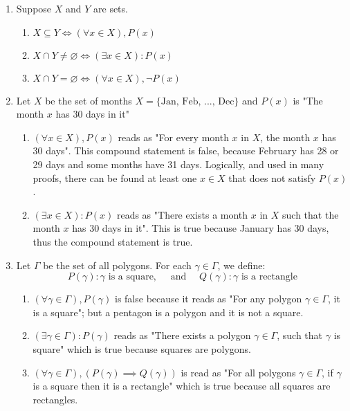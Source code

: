 \begin{example}

    \begin{enumerate}
        \item Suppose $X$ and $Y$ are sets.
            \begin{enumerate}[label=(\alph*)]
                \item $X \subseteq Y \iff (\forall x \in X), P(x)$
                \item $X \cap Y \neq \varnothing \iff (\exists x \in X): P(x)$
                \item $X \cap Y = \varnothing  \iff (\forall x \in X), \neg P(x)$
            \end{enumerate}

        \item Let $X$ be the set of months $X = \{\text{Jan, Feb, ..., Dec}\}$ and $P(x)$ is "The month $x$ has 30 days in it"
            \begin{enumerate}[label=(\alph*)]
                \item $(\forall x \in X), P(x)$ reads as "For every month $x$ in $X$, the month $x$ has 30 days". This compound statement is false, because February has 28 or 29 days and some months have 31 days. Logically, and used in many proofs, there can be found at least one $x \in X$ that does not satisfy $P(x)$.
                \item $(\exists x \in X): P(x)$ reads as "There exists a month $x$ in $X$ such that the month $x$ has 30 days in it". This is true because January has 30 days, thus the compound statement is true.
            \end{enumerate}

        \item Let $\Gamma$ be the set of all polygons. For each $\gamma \in \Gamma$, we define:
            $$
            P(\gamma): \gamma \text{ is a square}, \quad \text{ and } \quad Q(\gamma): \gamma \text{ is a rectangle}
            $$
            \begin{enumerate}[label=(\alph*)]
                \item $(\forall \gamma \in \Gamma), P(\gamma)$ is false because it reads as "For any polygon $\gamma \in \Gamma$, it is a square"; but a pentagon is a polygon and it is not a square.
                \item $(\exists \gamma \in \Gamma) : P(\gamma)$ reads as "There exists a polygon $\gamma \in \Gamma$, such that $\gamma$ is square" which is true because squares are polygons.
                \item $(\forall \gamma \in \Gamma), (P(\gamma) \implies Q(\gamma))$ is read as "For all polygons $\gamma \in \Gamma$, if $\gamma$ is a square then it is a rectangle" which is true because all squares are rectangles.
            \end{enumerate}


\end{enumerate}
\end{example}
